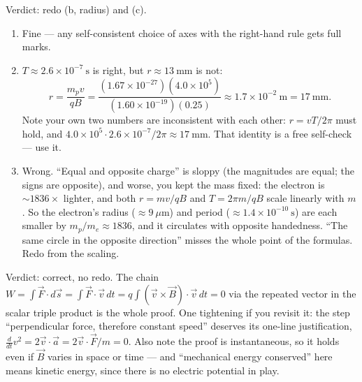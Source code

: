 \begin{feedback}[\cref{ex:em-5}]
Verdict: redo (b, radius) and (c).
\begin{enumerate}[label=(\alph*)]
  \item Fine --- any self-consistent choice of axes with the right-hand rule gets full marks.
  \item $T \approx 2.6\times 10^{-7}\ \mathrm{s}$ is right, but $r \approx 13\ \mathrm{mm}$ is not:
  \[
    r = \frac{m_p v}{qB} = \frac{(1.67\times 10^{-27})(4.0\times 10^{5})}{(1.60\times 10^{-19})(0.25)} \approx 1.7\times 10^{-2}\ \mathrm{m} = 17\ \mathrm{mm}.
  \]
  Note your own two numbers are inconsistent with each other: $r = vT/2\pi$ must hold, and $4.0\times 10^{5}\cdot 2.6\times 10^{-7}/2\pi \approx 17\ \mathrm{mm}$. That identity is a free self-check --- use it.
  \item Wrong. ``Equal and opposite charge'' is sloppy (the magnitudes are equal; the signs are opposite), and worse, you kept the mass fixed: the electron is $\sim 1836\times$ lighter, and both $r = mv/qB$ and $T = 2\pi m/qB$ scale linearly with $m$. So the electron's radius ($\approx 9\ \mu\mathrm{m}$) and period ($\approx 1.4\times 10^{-10}\ \mathrm{s}$) are each smaller by $m_p/m_e \approx 1836$, and it circulates with opposite handedness. ``The same circle in the opposite direction'' misses the whole point of the formulas. Redo from the scaling.
\end{enumerate}
\end{feedback}

\begin{feedback}[\cref{ex:em-6}]
Verdict: correct, no redo. The chain $W = \int \vec{F}\cdot d\vec{s} = \int \vec{F}\cdot\vec{v}\,dt = q\int(\vec{v}\times\vec{B})\cdot\vec{v}\,dt = 0$ via the repeated vector in the scalar triple product is the whole proof. One tightening if you revisit it: the step ``perpendicular force, therefore constant speed'' deserves its one-line justification, $\frac{d}{dt}v^2 = 2\vec{v}\cdot\vec{a} = 2\vec{v}\cdot\vec{F}/m = 0$. Also note the proof is instantaneous, so it holds even if $\vec{B}$ varies in space or time --- and ``mechanical energy conserved'' here means kinetic energy, since there is no electric potential in play.
\end{feedback}

